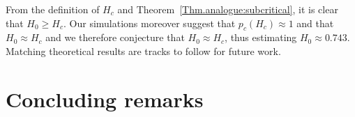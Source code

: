 \documentclass[10pt,a4paper]{amsart}
\theoremstyle{exampstyle}
\theoremstyle{exampnotations}
\begin{document}
\noindent From the definition of $H_c$ and Theorem~\ref{Thm.analogue:subcritical}, it is clear that $H_0 \geq H_c$. Our simulations moreover suggest that $p_c(H_c)\approx 1$ and that $H_0 \approx H_c$ and we therefore conjecture that $H_0 \approx H_c$, thus estimating $H_0 \approx 0.743$. Matching theoretical results are tracks to follow for future work.



\section{Concluding remarks}
\label{S.Conclusion}
\end{document}
